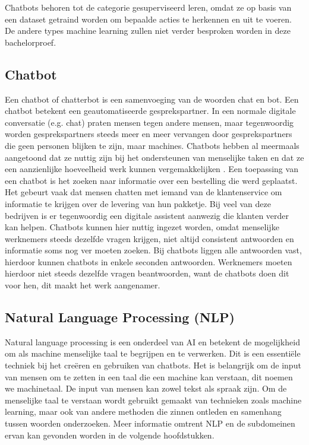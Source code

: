 Chatbots behoren tot de categorie gesuperviseerd leren, omdat ze op basis van een dataset getraind worden om bepaalde acties te herkennen en uit te voeren. De andere types machine learning zullen niet verder besproken worden in deze bachelorproef.

\subsection{Chatbot}
\label{subsec:begrippen-chatbot}

Een chatbot of chatterbot is een samenvoeging van de woorden chat en bot. Een chatbot betekent een geautomatiseerde gesprekspartner. In een normale digitale conversatie (e.g. chat) praten mensen tegen andere mensen, maar tegenwoordig worden gesprekspartners steeds meer en meer vervangen door gesprekspartners die geen personen blijken te zijn, maar machines. Chatbots hebben al meermaals aangetoond dat ze nuttig zijn bij het ondersteunen van menselijke taken en dat ze een aanzienlijke hoeveelheid werk kunnen vergemakkelijken \autocite{Atwell2007}. Een toepassing van een chatbot is het zoeken naar informatie over een bestelling die werd geplaatst. Het gebeurt vaak dat mensen chatten met iemand van de klantenservice om informatie te krijgen over de levering van hun pakketje. Bij veel van deze bedrijven is er tegenwoordig een digitale assistent aanwezig die klanten verder kan helpen. Chatbots kunnen hier nuttig ingezet worden, omdat menselijke werknemers steeds dezelfde vragen krijgen, niet altijd consistent antwoorden en informatie soms nog ver moeten zoeken. Bij chatbots liggen alle antwoorden vast, hierdoor kunnen chatbots in enkele seconden antwoorden. Werknemers moeten hierdoor niet steeds dezelfde vragen beantwoorden, want de chatbots doen dit voor hen, dit maakt het werk aangenamer. 

\subsection{Natural Language Processing (NLP)}
\label{subsec:begrippen-nlp}


Natural language processing is een onderdeel van AI en betekent de mogelijkheid om als machine menselijke taal te begrijpen en te verwerken. Dit is een essentiële techniek bij het creëren en gebruiken van chatbots. Het is belangrijk om de input van mensen om te zetten in een taal die een machine kan verstaan, dit noemen we machinetaal. De input van mensen kan zowel tekst als spraak zijn. Om de menselijke taal te verstaan wordt gebruikt gemaakt van technieken zoals machine learning, maar ook van andere methoden die zinnen  ontleden en samenhang tussen woorden onderzoeken. Meer informatie omtrent NLP en de subdomeinen ervan kan gevonden worden in de volgende hoofdstukken.


